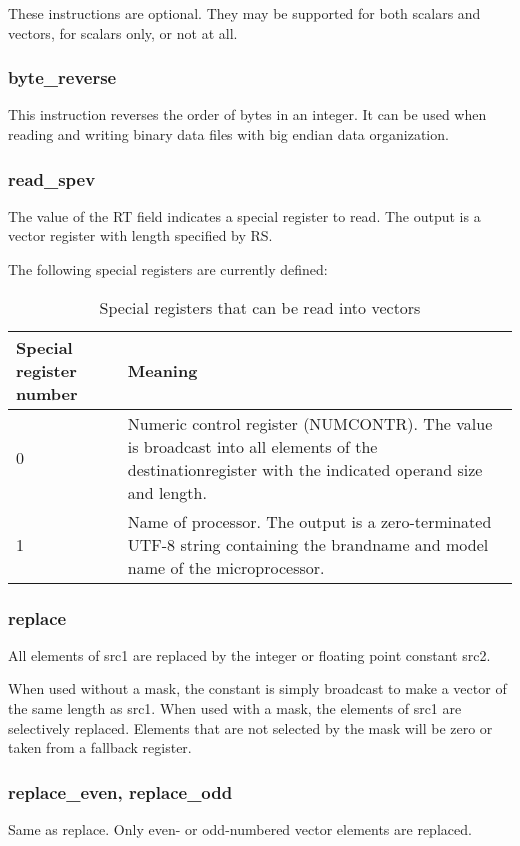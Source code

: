 \documentclass[forwardcom.tex]{subfiles}
\begin{document}
These instructions are optional. They may be supported for both scalars and vectors, for scalars only, or not at all.

\subsubsection{byte\_reverse}
This instruction reverses the order of bytes in an integer. It can be used when reading and writing binary data files with big endian data organization.

\subsubsection{read\_spev}
The value of the RT field indicates a special register to read. The output is a vector register with length specified by RS.
\vspace{2mm}

The following special registers are currently defined:

\begin{longtable} {|p{15mm}|p{100mm}|}
\caption{Special registers that can be read into vectors} 
\label{table:specialVectorRegisters} \\
\endfirsthead
\endhead
\hline
\bfseries Special register number & \bfseries Meaning  \\
\hline
0 & Numeric control register (NUMCONTR). The value is broadcast into all elements of the destinationregister with the indicated operand size and length.  \\
\hline
1 & Name of processor. The output is a zero-terminated UTF-8 string containing the brandname and model name of the microprocessor. \\
\hline
\end{longtable}

\subsubsection{replace}
All elements of src1 are replaced by the integer or floating point constant src2.
\vspace{2mm}

When used without a mask, the constant is simply broadcast to make a vector of the same length as src1. When used with a mask, the elements of src1 are selectively replaced. Elements that are not selected by the mask will be zero or taken from a fallback register.

\subsubsection{replace\_even, replace\_odd}
Same as replace. Only even- or odd-numbered vector elements are replaced.
\end{document}
